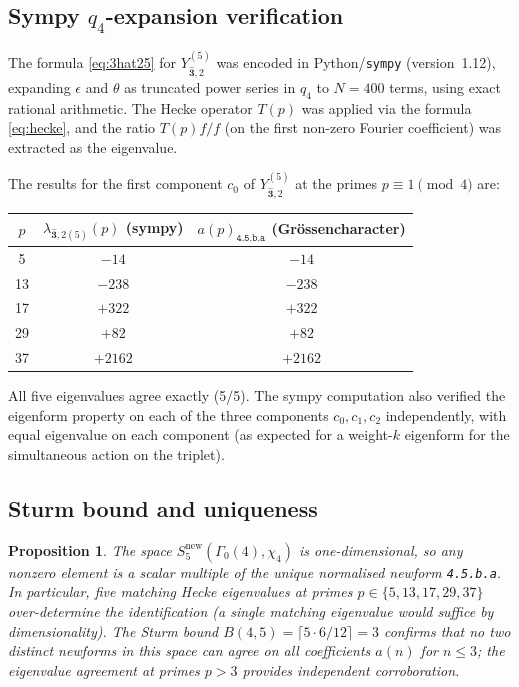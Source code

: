 \documentclass[12pt]{amsart}
\newtheorem{proposition}[theorem]{Proposition}
\theoremstyle{definition}
\newcommand{\Gam}{\Gamma}
\newcommand{\lmfdb}[1]{\texttt{#1}}  %
\newcommand{\hhat}[1]{\widehat{\mathbf{#1}}}  %
\begin{document}
\subsection{Sympy $q_4$-expansion verification}

The formula \eqref{eq:3hat25} for $Y_{\hhat{3},2}^{(5)}$ was encoded
in Python/\texttt{sympy} (version~1.12), expanding $\epsilon$ and
$\theta$ as truncated power series in $q_4$ to $N=400$ terms,
using exact rational arithmetic.
The Hecke operator $T(p)$ was applied via the formula \eqref{eq:hecke},
and the ratio $T(p)f/f$ (on the first non-zero Fourier coefficient)
was extracted as the eigenvalue.

The results for the first component $c_0$ of $Y_{\hhat{3},2}^{(5)}$
at the primes $p \equiv 1 \pmod{4}$ are:

\begin{center}
\begin{tabular}{@{}ccc@{}}
  \toprule
  $p$ & $\lambda_{\hhat{3},2(5)}(p)$ (sympy) &
        $a(p)_{\lmfdb{4.5.b.a}}$ (Gr\"ossencharacter) \\
  \midrule
  5  & $-14$   & $-14$   \\
  13 & $-238$  & $-238$  \\
  17 & $+322$  & $+322$  \\
  29 & $+82$   & $+82$   \\
  37 & $+2162$ & $+2162$ \\
  \bottomrule
\end{tabular}
\end{center}
\vspace{4pt}

All five eigenvalues agree exactly (5/5).  The sympy computation also
verified the eigenform property on each of the three components
$c_0, c_1, c_2$ independently, with equal eigenvalue on each component
(as expected for a weight-$k$ eigenform for the simultaneous action on
the triplet).

\subsection{Sturm bound and uniqueness}

\begin{proposition}\label{prop:sturm-4}
  The space $S_5^{\mathrm{new}}(\Gam_0(4),\chi_4)$ is one-dimensional,
  so any nonzero element is a scalar multiple of the unique normalised
  newform \lmfdb{4.5.b.a}.  In particular, five matching Hecke
  eigenvalues at primes $p\in\{5,13,17,29,37\}$ over-determine the
  identification (a single matching eigenvalue would suffice by
  dimensionality).  The Sturm bound
  $B(4,5) = \lceil 5\cdot6/12\rceil = 3$
  confirms that no two distinct newforms in this space can agree on
  all coefficients $a(n)$ for $n\le 3$; the eigenvalue agreement
  at primes $p>3$ provides independent corroboration.
\end{proposition}
\end{document}
